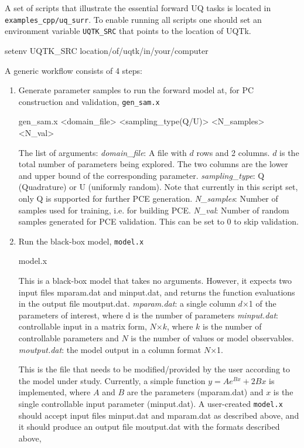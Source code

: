 A set of scripts that illustrate the essential forward UQ tasks is located in  \texttt{examples\_cpp/uq\_surr}.
To enable running all scripts one should set an environment variable \texttt{UQTK\_SRC} that points to the location of UQTk.

\begin{ShellCmd}
setenv UQTK_SRC location/of/uqtk/in/your/computer
\end{ShellCmd}


A generic workflow consists of 4 steps:
\begin{enumerate}
\item Generate parameter samples to run the forward model at, for PC construction and validation, \texttt{gen\_sam.x}
\begin{ShellCmd}
gen_sam.x <domain_file> <sampling_type(Q/U)> <N_samples> <N_val>
\end{ShellCmd}
The list of arguments:
\subitem \emph{domain\_file}: A file with $d$ rows and 2 columns. $d$ is the total number of parameters being explored.
           The two columns are the lower and upper bound of the corresponding parameter.
\subitem \emph{sampling\_type}: Q (Quadrature) or U (uniformly random). Note that currently in this script set, only Q is supported for further PCE generation.
\subitem \emph{N\_samples}: Number of samples used for training, i.e. for building PCE.
\subitem \emph{N\_val}:  Number of random samples generated for PCE validation. This can be set to 0 to skip validation.

\item Run the black-box model, \texttt{model.x}
\begin{ShellCmd}
model.x
\end{ShellCmd}
This is a black-box model that takes no arguments. However, it expects two input files mparam.dat and minput.dat, and returns the function evaluations in the output file moutput.dat.
\subitem \emph{mparam.dat}: a single column $d$$\times$1 of the parameters of interest, where d is the number of parameters 
\subitem \emph{minput.dat}: controllable input in a matrix form, $N$$\times$$k$, where $k$ is the number of controllable parameters and $N$ is the number of values or model observables.
\subitem \emph{moutput.dat}: the model output in a column format $N$$\times$1.

This is the file that needs to be modified/provided by the user according to the model under study. Currently, a simple function $y=Ae^{Bx}+2Bx$ is implemented, where $A$ and $B$ are the parameters (mparam.dat) and $x$ is the single controllable input parameter (minput.dat). A user-created \texttt{model.x} should accept input files minput.dat and mparam.dat as described above, and it should produce an output file moutput.dat with the formats described above, 


\end{enumerate}
